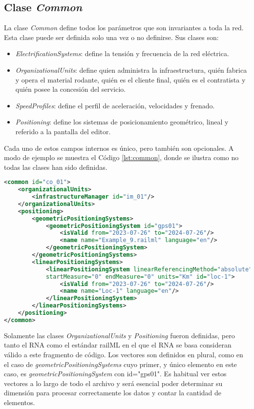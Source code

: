 \subsection{Clase \textit{Common}}
    \label{sec:common}

    La clase \textit{Common} define todos los parámetros que son invariantes a toda la red. Esta clase puede ser definida solo una vez o no definirse. Sus clases son:

    \begin{itemize}
        \item \textit{ElectrificationSystems}: define la tensión y frecuencia de la red eléctrica.
        \item \textit{OrganizationalUnits}: define quien administra la infraestructura, quién fabrica y opera el material rodante, quién es el cliente final, quién es el contratista y quién posee la concesión del servicio. 
        \item \textit{SpeedProfiles}: define el perfil de aceleración, velocidades y frenado.
        \item \textit{Positioning}: define los sistemas de posicionamiento geométrico, lineal y referido a la pantalla del editor.
    \end{itemize}

    Cada uno de estos campos internos es único, pero también son opcionales. A modo de ejemplo se muestra el Código \ref{lst:common}, donde se ilustra como no todas las clases han sido definidas.
    
    \begin{lstlisting}[language = XML, caption = Clase \textit{Common} , label = {lst:common}]
<common id="co_01">
    <organizationalUnits>
        <infrastructureManager id="im_01"/>
    </organizationalUnits>
    <positioning>
        <geometricPositioningSystems>
            <geometricPositioningSystem id="gps01">
                <isValid from="2023-07-26" to="2024-07-26"/>
                <name name="Example_9.railml" language="en"/>
            </geometricPositioningSystem>
        </geometricPositioningSystems>
        <linearPositioningSystems>
            <linearPositioningSystem linearReferencingMethod="absolute" 
            startMeasure="0" endMeasure="0" units="Km" id="loc-1">
                <isValid from="2023-07-26" to="2024-07-26"/>
                <name name="Loc-1" language="en"/>
            </linearPositioningSystem>
        </linearPositioningSystems>
    </positioning>
</common>
    \end{lstlisting}

    Solamente las clases \textit{OrganizationalUnits} y \textit{Positioning} fueron definidas, pero tanto el RNA como el estándar railML en el que el RNA se basa consideran válido a este fragmento de código. Los vectores son definidos en plural, como en el caso de \textit{geometricPositioningSystems} cuyo primer, y único elemento en este caso, es \textit{geometricPositioningSystem} con id="gps01". Es habitual ver estos vectores a lo largo de todo el archivo y será esencial poder determinar su dimensión para procesar correctamente los datos y contar la cantidad de elementos.